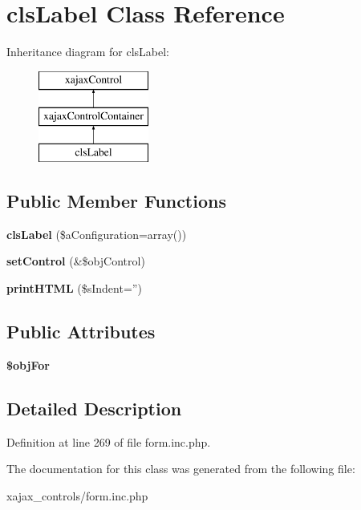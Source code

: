 \hypertarget{classclsLabel}{
\section{clsLabel Class Reference}
\label{classclsLabel}
}
Inheritance diagram for clsLabel:\begin{figure}[H]
\begin{center}
\leavevmode
\includegraphics[height=3.000000cm]{classclsLabel}
\end{center}
\end{figure}
\subsection*{Public Member Functions}
\begin{DoxyCompactItemize}
\item 
\hypertarget{classclsLabel_a46d2704562c83935d036fd8e06f6f1d1}{
{\bfseries clsLabel} (\$aConfiguration=array())}
\label{classclsLabel_a46d2704562c83935d036fd8e06f6f1d1}

\item 
\hypertarget{classclsLabel_a00d6c5ad38575b8550e5d402e06b8e5f}{
{\bfseries setControl} (\&\$objControl)}
\label{classclsLabel_a00d6c5ad38575b8550e5d402e06b8e5f}

\item 
\hypertarget{classclsLabel_ab1bbc597d72c94b5e651950b6542b38c}{
{\bfseries printHTML} (\$sIndent='')}
\label{classclsLabel_ab1bbc597d72c94b5e651950b6542b38c}

\end{DoxyCompactItemize}
\subsection*{Public Attributes}
\begin{DoxyCompactItemize}
\item 
\hypertarget{classclsLabel_af97462aa53e20e675812d2d1e6fb9f43}{
{\bfseries \$objFor}}
\label{classclsLabel_af97462aa53e20e675812d2d1e6fb9f43}

\end{DoxyCompactItemize}


\subsection{Detailed Description}


Definition at line 269 of file form.inc.php.



The documentation for this class was generated from the following file:\begin{DoxyCompactItemize}
\item 
xajax\_\-controls/form.inc.php\end{DoxyCompactItemize}

